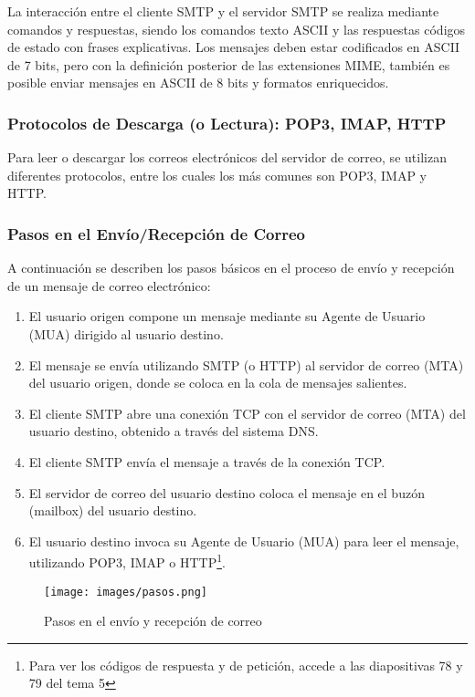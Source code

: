 \documentclass[a4paper,12pt]{article}
\begin{document}
La interacción entre el cliente SMTP y el servidor SMTP se realiza mediante comandos y respuestas, siendo los comandos texto ASCII y las respuestas códigos de estado con frases explicativas. Los mensajes deben estar codificados en ASCII de 7 bits, pero con la definición posterior de las extensiones MIME, también es posible enviar mensajes en ASCII de 8 bits y formatos enriquecidos.

\subsubsection{Protocolos de Descarga (o Lectura): POP3, IMAP, HTTP}
Para leer o descargar los correos electrónicos del servidor de correo, se utilizan diferentes protocolos, entre los cuales los más comunes son POP3, IMAP y HTTP.

\subsubsection{Pasos en el Envío/Recepción de Correo}
A continuación se describen los pasos básicos en el proceso de envío y recepción de un mensaje de correo electrónico:

\begin{enumerate}
    \item El usuario origen compone un mensaje mediante su Agente de Usuario (MUA) dirigido al usuario destino.
    \item El mensaje se envía utilizando SMTP (o HTTP) al servidor de correo (MTA) del usuario origen, donde se coloca en la cola de mensajes salientes.
    \item El cliente SMTP abre una conexión TCP con el servidor de correo (MTA) del usuario destino, obtenido a través del sistema DNS.
    \item El cliente SMTP envía el mensaje a través de la conexión TCP.
    \item El servidor de correo del usuario destino coloca el mensaje en el buzón (mailbox) del usuario destino.
    \item El usuario destino invoca su Agente de Usuario (MUA) para leer el mensaje, utilizando POP3, IMAP o HTTP\footnote{Para ver los códigos de respuesta y de petición, accede a las diapositivas 78 y 79 del tema 5}.
\end{enumerate}



\begin{figure}[H]
    \centering
    \texttt{[image: images/pasos.png]}
    \caption{Pasos en el envío y recepción de correo}
    \label{fig:pasos}
\end{figure}
\end{document}
